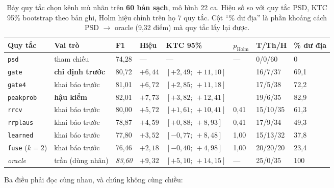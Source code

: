 \begin{table}[H]\centering\footnotesize
\caption{Bảy quy tắc chọn kênh mù nhãn trên \textbf{60 bản sạch}, mô hình 22 ca. Hiệu số so với quy tắc
PSD, KTC 95\% bootstrap theo bản ghi, Holm hiệu chỉnh trên họ 7 quy tắc. Cột ``\% dư địa'' là phần
khoảng cách PSD $\to$ oracle (9,32 điểm) mà quy tắc lấy lại được.}
\label{tab:quytac60}
\begin{tabular}{@{}L{2.0cm} L{2.3cm} C{0.9cm} C{1.1cm} C{2.3cm} C{1.2cm} C{1.4cm} C{1.0cm}@{}}
\toprule
\textbf{Quy tắc} & \textbf{Vai trò} & \textbf{F1} & \textbf{Hiệu} & \textbf{KTC 95\%} &
\textbf{$p_{\text{Holm}}$} & \textbf{T/Th/H} & \textbf{\% dư địa} \\
\midrule
\texttt{psd} & tham chiếu & 74,28 & --- & --- & --- & 0/0/60 & 0 \\
\texttt{gate} & \textbf{chỉ định trước} & 80,72 & $+6{,}44$ & $[+2{,}49;\ +11{,}10]$ &  & 16/7/37 & 69,1 \\
\texttt{gate4} & khai báo trước & 81,01 & $+6{,}72$ & $[+2{,}85;\ +11{,}18]$ &  & 17/5/38 & 72,2 \\
\texttt{peakprob} & \textbf{hậu kiểm} & 82,01 & $+7{,}73$ & $[+3{,}82;\ +12{,}41]$ &  & 19/6/35 & 82,9 \\
\texttt{rrcv} & khai báo trước & 80,00 & $+5{,}72$ & $[+1{,}61;\ +10{,}41]$ & 0,41 & 15/10/35 & 61,3 \\
\texttt{rrplaus} & khai báo trước & 78,87 & $+4{,}59$ & $[+0{,}88;\ +8{,}93]$ & 0,41 & 17/9/34 & 49,3 \\
\texttt{learned} & khai báo trước & 77,80 & $+3{,}52$ & $[-0{,}77;\ +8{,}48]$ & 1,00 & 15/13/32 & 37,8 \\
\texttt{fuse} ($k = 2$) & khai báo trước & 76,46 & $+2{,}18$ & $[-0{,}40;\ +4{,}98]$ & 1,00 & 20/20/20 & 23,4 \\
\midrule
\textit{oracle} & trần (dùng nhãn) & \textit{83,60} & $+9{,}32$ & $[+5{,}10;\ +14{,}15]$ & --- & 25/0/35 & 100 \\
\bottomrule
\end{tabular}
\end{table}

Ba điều phải đọc cùng nhau, và chúng không cùng chiều:

